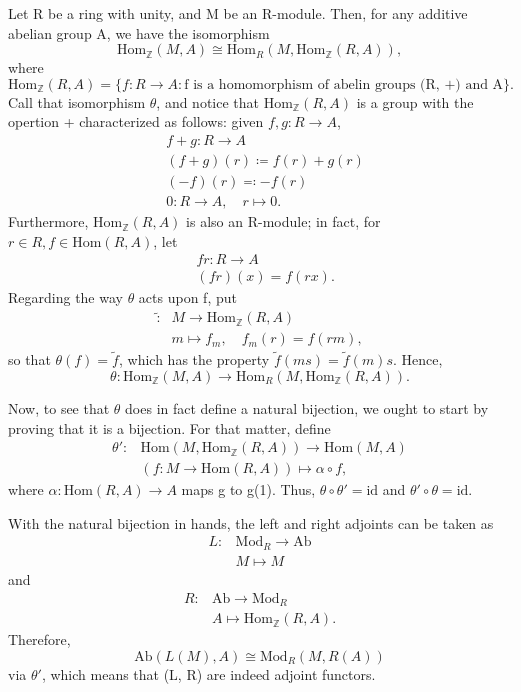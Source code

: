 \documentclass[../category_theory.tex]{subfiles}
\begin{document}
\begin{example}
	Let R be a ring with unity, and M be an R-module. Then, for any additive abelian group A, we have the isomorphism
	\[
		\mathrm{Hom}_{\mathbb{Z}}(M, A)\cong \mathrm{Hom}_{R}(M, \mathrm{Hom}_{\mathbb{Z}}(R, A)),
	\]
	where
	\[
		\mathrm{Hom}_{\mathbb{Z}}(R, A)=\{f:R\rightarrow A: \text{f is a homomorphism of abelin groups (R, +) and A}\}.
	\]
	Call that isomorphism \(\theta \), and notice that \(\mathrm{Hom}_{\mathbb{Z}}(R, A)\) is a group with the opertion + characterized as follows: given \(f, g:R\rightarrow A\),
	\begin{align*}
		 & f+g:R\rightarrow A                 \\
		 & (f+g)(r)\coloneqq f(r)+g(r)        \\
		 & (-f)(r)\eqqcolon -f(r)             \\
		 & 0:R\rightarrow A,\quad r\mapsto 0.
	\end{align*}
	Furthermore, \(\mathrm{Hom}_{\mathbb{Z}}(R, A)\) is also an R-module; in fact, for \(r\in R, f\in \mathrm{Hom}(R, A)\), let
	\begin{align*}
		 & fr:R\rightarrow A \\
		 & (fr)(x)=f(rx).
	\end{align*}
	Regarding the way \(\theta \) acts upon f, put
	\begin{align*}
		\tilde: & M\rightarrow \mathrm{Hom}_{\mathbb{Z}}(R, A) \\
		        & m\mapsto f_{m},\quad f_{m}(r)=f(rm),
	\end{align*}
	so that \(\theta (f)=\tilde f\), which has the property \(\tilde f(ms)=\tilde f(m)s\). Hence,
	\[
		\theta :\mathrm{Hom}_{\mathbb{Z}}(M, A)\rightarrow \mathrm{Hom}_{R}(M, \mathrm{Hom}_{\mathbb{Z}}(R, A)).
	\]

	Now, to see that \(\theta \) does in fact define a natural bijection, we ought to start by proving that it is a bijection. For that matter, define
	\begin{align*}
		\theta': & \mathrm{Hom}(M, \mathrm{Hom}_{\mathbb{Z}}(R, A))\rightarrow \mathrm{Hom}(M, A) \\
		         & (f:M\rightarrow \mathrm{Hom}(R, A))\mapsto \alpha \circ f,
	\end{align*}
	where \(\alpha :\mathrm{Hom}(R, A)\rightarrow A\) maps g to g(1). Thus, \(\theta \circ \theta' =\mathrm{id} \) and \(\theta '\circ \theta =\mathrm{id}\).

	With the natural bijection in hands, the left and right adjoints can be taken as
	\begin{align*}
		L: & \mathrm{Mod}_{R}\rightarrow \mathrm{Ab} \\
		   & M\mapsto M
	\end{align*}
	and
	\begin{align*}
		R: & \mathrm{Ab}\rightarrow \mathrm{Mod}_{R}   \\
		   & A\mapsto \mathrm{Hom}_{\mathbb{Z}}(R, A).
	\end{align*}
	Therefore,
	\[
		\mathrm{Ab}(L(M), A)\cong \mathrm{Mod}_{R}(M, R(A))
	\]
	via \(\theta' \), which means that (L, R) are indeed adjoint functors.
\end{example}
\end{document}
